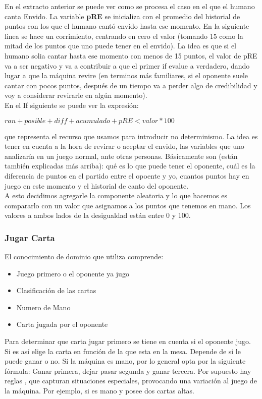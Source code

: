 \documentclass[12pt,a4paper]{article}
\begin{document}
\noindent En el extracto anterior se puede ver como se procesa el caso en el que el humano canta Envido.
La variable \textbf{pRE} se inicializa con el promedio del historial de puntos con los que el humano
cant\'o envido hasta ese momento. En la siguiente linea	se hace un corrimiento, centrando en cero el valor
(tomando 15 como la mitad de los puntos que uno puede tener en el envido). La idea es que si el humano
solia cantar hasta ese momento con menos de 15 puntos, el valor de pRE va a ser negativo y va a contribuir
a que el primer if evalue a verdadero, dando lugar a que la m\'aquina revire (en terminos m\'as familiares,
si el oponente suele cantar con pocos puntos, despu\'es de un tiempo va a perder algo de credibilidad y voy 
a considerar revirarle en alg\'un momento).\\
\noindent En el If siguiente se puede ver la expresi\'on: 
\begin{center}
	$ ran + posible + diff + acumulado + pRE  <  valor  * 100 $
\end{center}
que representa el recurso que usamos para introducir no determinismo. La idea es tener en cuenta a la hora de revirar
o aceptar el envido, las variables que uno analizar\'ia en un juego normal, ante otras personas. B\'asicamente son 
(est\'an tambi\'en explicadas m\'as arriba): qu\'e es lo que puede tener el oponente, cu\'al es la diferencia de puntos
en el partido entre el opoente y yo, cuantos puntos hay en juego en este momento y el historial de canto del oponente.\\
\noindent A esto decidimos agregarle la componente aleatoria y lo que hacemos es compararlo con un valor que asignamos a
los puntos que tenemos en mano. Los valores a ambos lados de la desigualdad est\'an entre 0 y 100.



\subsubsection{Jugar Carta}
El conocimiento de dominio que utiliza comprende:
\begin{itemize}
\item Juego primero o  el oponente ya jugo
\item Clasificaci\'on de las cartas
\item Numero de Mano
\item Carta jugada por el oponente
\end{itemize}

Para determinar que carta jugar primero se tiene en cuenta si el oponente jugo. Si es as\'i elige la carta en 
funci\'on de la que esta en la mesa. Depende de si le puede ganar o no.
Si la m\'aquina es mano, por lo general opta por la siguiente f\'ormula: Ganar primera, dejar pasar segunda y ganar tercera. 
Por supuesto hay reglas , que capturan situaciones especiales, provocando una variaci\'on al juego de la m\'aquina. Por ejemplo, si es mano y posee dos cartas altas.
\end{document}
